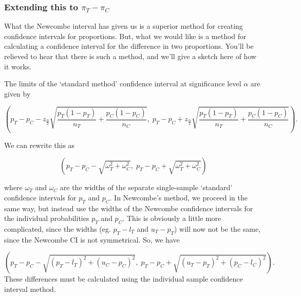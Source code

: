 \documentclass[
  openany]{book}
\theoremstyle{definition}
\theoremstyle{definition}
\theoremstyle{definition}
\theoremstyle{definition}
\theoremstyle{remark}
\begin{document}
\hypertarget{extending-this-to-pi_t---pi_c}{%
\subsubsection{\texorpdfstring{Extending this to \(\pi_T - \pi_C\)}{Extending this to \textbackslash pi\_T - \textbackslash pi\_C}}\label{extending-this-to-pi_t---pi_c}}

What the Newcombe interval has given us is a superior method for creating confidence intervals for proportions. But, what we would like is a method for calculating a confidence interval for the difference in two proportions. You'll be relieved to hear that there is such a method, and we'll give a sketch here of how it works.

The limits of the `standard method' confidence interval at significance level \(\alpha\) are given by

\begin{equation}
\left(p_T - p_C - z_{\frac{\alpha}{2}}\sqrt{\frac{p_T\left(1-p_T\right)}{n_T} + \frac{p_C\left(1-p_C\right)}{n_C}},\; p_T - p_C + z_{\frac{\alpha}{2}}\sqrt{\frac{p_T\left(1-p_T\right)}{n_T} + \frac{p_C\left(1-p_C\right)}{n_C}}\right).
\label{eq:ardci}
\end{equation}

We can rewrite this as

\begin{equation}
\left(p_T - p_C - \sqrt{\omega^2_T + \omega^2_C},\; p_T - p_C + \sqrt{\omega^2_T + \omega^2_C}\right)
\end{equation}

where \(\omega_T\) and \(\omega_C\) are the widths of the separate single-sample `standard' confidence intervals for \(p_T\) and \(p_C\). In Newcombe's method, we proceed in the same way, but instead use the widths of the Newcombe confidence intervals for the individual probabilities \(p_T\) and \(p_C\). This is obviously a little more complicated, since the widths (eg. \(p_T - l_T\) and \(u_T - p_T\)) will now not be the same, since the Newcombe CI is not symmetrical. So, we have

\[
\left(p_T - p_C - \sqrt{\left(p_T-l_T\right)^2 + \left(u_C - p_C\right)^2},\; p_T - p_C + \sqrt{\left(u_T - p_T\right)^2 + \left(p_C - l_C\right)^2}\right).
\]
These differences must be calculated using the individual sample confidence interval method.
\end{document}
